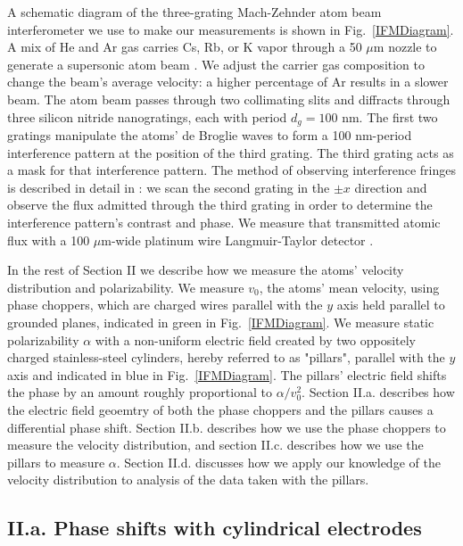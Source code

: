 \documentclass[twocolumn,prl,showpacs,superscriptaddress]{revtex4-1}   %
\newcommand{\figref}[1]{Fig.~\ref{#1}}
\begin{document}
A schematic diagram of the three-grating Mach-Zehnder atom beam interferometer we use to make our measurements is shown in \figref{IFMDiagram}. 
A mix of He and Ar gas carries Cs, Rb, or K vapor through a 50 $\mu$m nozzle to generate a supersonic atom beam \cite{Scoles}\cite{Ekstrom1993}. We adjust the carrier gas composition to change the beam's average velocity: a higher percentage of Ar results in a slower beam.
The atom beam passes through two collimating slits and diffracts through three silicon nitride nanogratings, each with period $d_g = 100$ nm.
The first two gratings manipulate the atoms' de Broglie waves to form a 100 nm-period interference pattern at the position of the third grating. 
The third grating acts as a mask for that interference pattern. 
The method of observing interference fringes is described in detail in \cite{Kokorowski2001}: we scan the second grating in the $\pm x$ direction and observe the flux admitted through the third grating in order to determine the interference pattern's contrast and phase.
We measure that transmitted atomic flux with a 100 $\mu$m-wide platinum wire Langmuir-Taylor detector \cite{Delhuille2002}.

In the rest of Section II we describe how we measure the atoms' velocity distribution and polarizability.
We measure $v_0$, the atoms' mean velocity, using phase choppers, which are charged wires parallel with the $y$ axis held parallel to grounded planes, indicated in green in \figref{IFMDiagram}.
We measure static polarizability $\alpha$ with a non-uniform electric field created by two oppositely charged stainless-steel cylinders, hereby referred to as "pillars", parallel with the $y$ axis and indicated in blue in \figref{IFMDiagram}. The pillars' electric field shifts the phase by an amount roughly proportional to $\alpha/v_0^2$. 
Section II.a. describes how the electric field geoemtry of both the phase choppers and the pillars causes a differential phase shift. Section II.b. describes how we use the phase choppers to measure the velocity distribution, and section II.c. describes how we use the pillars to measure $\alpha$. Section II.d. discusses how we apply our knowledge of the velocity distribution to analysis of the data taken with the pillars.


\subsection{II.a. Phase shifts with cylindrical electrodes}
\end{document}
